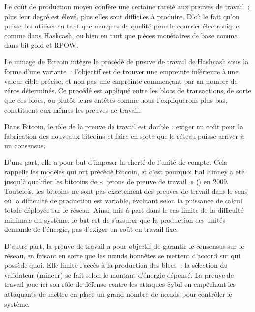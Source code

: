 Le coût de production moyen confère une certaine rareté aux preuves de travail~: plus leur degré est élevé, plus elles sont difficiles à produire. D'où le fait qu'on puisse les utiliser en tant que marques de qualité pour le courrier électronique comme dans Hashcash, ou bien en tant que pièces monétaires de base comme dans bit gold et RPOW.


Le minage de Bitcoin intègre le procédé de preuve de travail de Hashcash sous la forme d'une variante~: l'objectif est de trouver une empreinte inférieure à une valeur cible précise, et non pas une empreinte commençant par un nombre de zéros déterminés. Ce procédé est appliqué entre les blocs de transactions, de sorte que ces blocs, ou plutôt leurs entêtes comme nous l'expliquerons plus bas, constituent eux-mêmes les preuves de travail.

Dans Bitcoin, le rôle de la preuve de travail est double~: exiger un coût pour la fabrication des nouveaux bitcoins et faire en sorte que le réseau puisse arriver à un consensus.

D'une part, elle a pour but d'imposer la cherté de l'unité de compte. Cela rappelle les modèles qui ont précédé Bitcoin, et c'est pourquoi Hal Finney a été jusqu'à qualifier les bitcoins de «~jetons de preuve de travail~» () en 2009. Toutefois, les bitcoins ne sont pas exactement des preuves de travail dans le sens où la difficulté de production est variable, évoluant selon la puissance de calcul totale déployée sur le réseau. Ainsi, mis à part dans le cas limite de la difficulté minimale du système, le but est de s'assurer que la production des unités demande de l'énergie, pas d'exiger un coût en travail fixe.

D'autre part, la preuve de travail a pour objectif de garantir le consensus sur le réseau, en faisant en sorte que les nœuds honnêtes se mettent d'accord sur qui possède quoi. Elle limite l'accès à la production des blocs~: la sélection du validateur (mineur) se fait selon le montant d'énergie dépensé. La preuve de travail joue ici son rôle de défense contre les attaques Sybil en empêchant les attaquants de mettre en place un grand nombre de nœuds pour contrôler le système.

